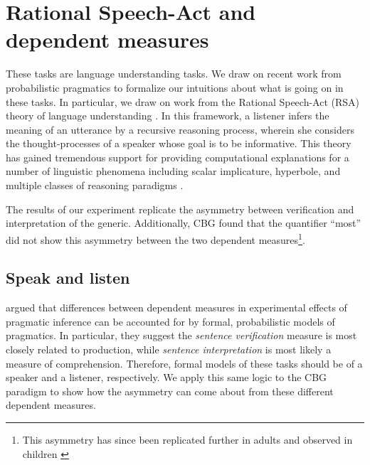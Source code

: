 \documentclass[10pt,letterpaper]{article}
\begin{document}

\section{Rational Speech-Act and dependent measures}


These tasks are language understanding tasks. We draw on recent work from probabilistic pragmatics to formalize our intuitions about what is going on in these tasks. In particular, we draw on work from the Rational Speech-Act (RSA) theory of language understanding \cite{Frank2012}. In this framework, a listener infers the meaning of an utterance by a recursive reasoning process, wherein she considers the thought-processes of a speaker whose goal is to be informative. This theory has gained tremendous support for providing computational explanations for a number of linguistic phenomena including scalar implicature, hyperbole, and multiple classes of reasoning paradigms \cite{Goodman2013, Kao2014, Tessler2014, Lassiter2014}. 


The results of our experiment replicate the asymmetry between verification and interpretation of the generic. Additionally, CBG  found that the quantifier ``most'' did not show this asymmetry between the two dependent measures\footnote{This asymmetry has since been replicated further in adults and observed in children \cite{Brandone2014}}. 

\subsection{Speak and listen}

 argued that differences between dependent measures in experimental effects of pragmatic inference can be accounted for by formal, probabilistic models of pragmatics. In particular, they suggest the \emph{sentence verification} measure is most closely related to production, while \emph{sentence interpretation} is most likely a measure of comprehension. Therefore, formal models of these tasks should be of a speaker and a listener, respectively. We apply this same logic to the CBG paradigm to show how the asymmetry can come about from these different dependent measures.
\end{document}
